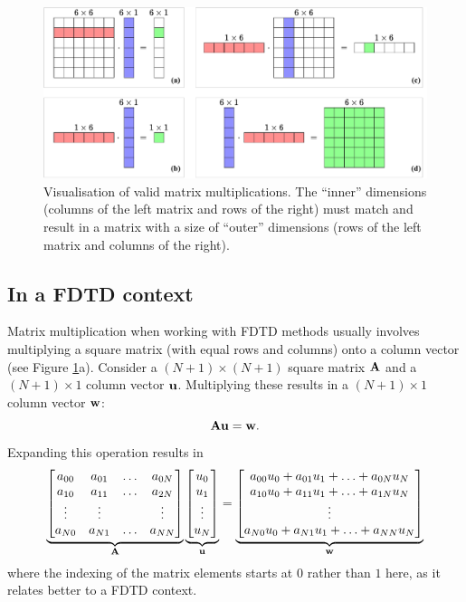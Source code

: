 \begin{figure}[h]
    \includegraphics[width=\textwidth]{figures/analysis/matrixVector.pdf}
    \caption{Visualisation of valid matrix multiplications. The ``inner'' dimensions (columns of the left matrix and rows of the right) must match and result in a matrix with a size of ``outer'' dimensions (rows of the left matrix and columns of the right). \label{fig:matrixVector}}
\end{figure}

\subsection{In a FDTD context}
Matrix multiplication when working with FDTD methods usually involves multiplying a square matrix (with equal rows and columns) onto a column vector (see Figure \ref{fig:matrixVector}a). Consider a $(N+1)\times (N+1)$ square matrix $\mathbf{A}$ and a $(N+1) \times 1$ column vector $\mathbf{u}$. Multiplying these results in a $(N+1) \times 1$ column vector $\mathbf{w}$:
\begin{equation}
    \mathbf{A}\mathbf{u} = \mathbf{w}.
\end{equation}
Expanding this operation results in
\begin{equation}
    \underbrace{\begin{bmatrix}
        a_{00} & a_{01} & \hdots & a_{0N}\\
        a_{10} & a_{11} & \hdots & a_{2N}\\
        \vdots & \vdots & &\vdots\\
        a_{N0} & a_{N1} & \hdots & a_{NN}
    \end{bmatrix}}_{\mathbf{A}}
    \underbrace{\begin{bmatrix}
        u_0\\
        u_1\\
        \vdots\\
        u_N
    \end{bmatrix}}_{\mathbf{u}} = 
    \underbrace{\begin{bmatrix}
        a_{00}u_0 + a_{01}u_1 + \hdots + a_{0N}u_N\\
        a_{10}u_0 + a_{11}u_1 + \hdots + a_{1N}u_N\\
        \vdots\\
        a_{N0}u_0 + a_{N1}u_1 + \hdots + a_{NN}u_N
    \end{bmatrix}}_{\mathbf{w}}
\end{equation}
where the indexing of the matrix elements starts at $0$ rather than $1$ here, as it relates better to a FDTD context.

